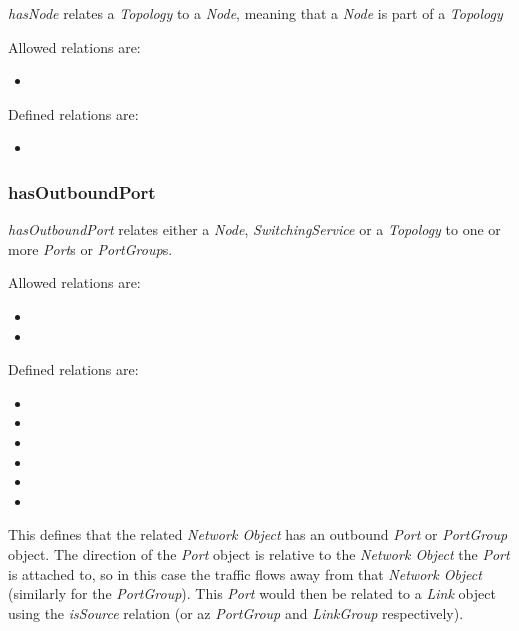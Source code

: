 \emph{hasNode} relates a \emph{Topology} to a \emph{Node}, meaning that a \emph{Node} is part of a \emph{Topology}

Allowed relations are:
\begin{itemize}
    \item {}
\end{itemize}

Defined relations are:
\begin{itemize}
    \item {}
\end{itemize}


\subsubsection{hasOutboundPort}%
\label{rel:hasOutboundPort}

\emph{hasOutboundPort} relates either a \emph{Node}, \emph{SwitchingService} or a \emph{Topology} to one or more \emph{Port}s or \emph{PortGroup}s.

Allowed relations are:
\begin{itemize}
    \item {}
    \item {}
\end{itemize}

Defined relations are:
\begin{itemize}
    \item {}
    \item {}
    \item {}
    \item {}
    \item {}
    \item {}
\end{itemize}

This defines that the related \emph{Network Object} has an outbound \emph{Port} or \emph{PortGroup} object. The direction of the \emph{Port} object is relative to the \emph{Network Object} the \emph{Port} is attached to, so in this case the traffic flows away from that \emph{Network Object} (similarly for the \emph{PortGroup}). This \emph{Port} would then be related to a \emph{Link} object using the \emph{isSource} relation (or az \emph{PortGroup} and \emph{LinkGroup} respectively).

